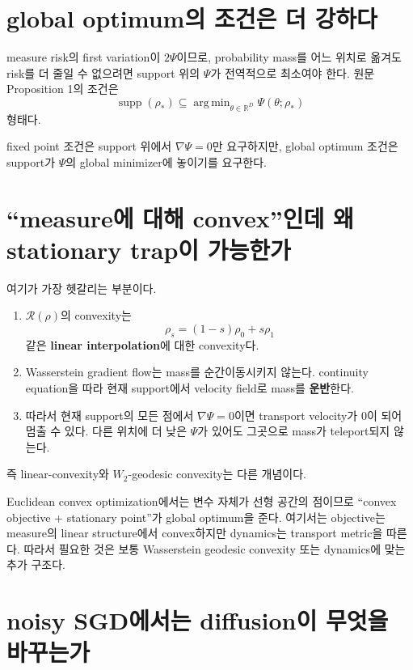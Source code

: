 \documentclass[11pt,a4paper,oneside,openany]{memoir}
\newcommand{\R}{\mathbb{R}}
\newcommand{\Risk}{\mathcal{R}}
\newcommand{\grad}{\nabla}
\newcommand{\supp}{\operatorname{supp}}
\DeclareMathOperator*{\argmin}{arg\,min}
\theoremstyle{definition}
\begin{document}
\section{global optimum의 조건은 더 강하다}

measure risk의 first variation이 $2\Psi$이므로, probability mass를 어느 위치로 옮겨도 risk를 더 줄일 수
없으려면 support 위의 $\Psi$가 전역적으로 최소여야 한다. 원문 Proposition 1의 조건은
\[
  \supp(\rho_*)
  \subseteq\argmin_{\theta\in\R^D}\Psi(\theta;\rho_*)
\]
형태다.

fixed point 조건은 support 위에서 $\grad\Psi=0$만 요구하지만,
global optimum 조건은 support가 $\Psi$의 global minimizer에 놓이기를 요구한다.

\section{``measure에 대해 convex''인데 왜 stationary trap이 가능한가}

여기가 가장 헷갈리는 부분이다.

\begin{enumerate}
  \item $\Risk(\rho)$의 convexity는
  \[
    \rho_s=(1-s)\rho_0+s\rho_1
  \]
  같은 \textbf{linear interpolation}에 대한 convexity다.

  \item Wasserstein gradient flow는 mass를 순간이동시키지 않는다. continuity equation을 따라
  현재 support에서 velocity field로 mass를 \textbf{운반}한다.

  \item 따라서 현재 support의 모든 점에서 $\grad\Psi=0$이면 transport velocity가 0이 되어 멈출 수 있다.
  다른 위치에 더 낮은 $\Psi$가 있어도 그곳으로 mass가 teleport되지 않는다.
\end{enumerate}

즉 linear-convexity와 $W_2$-geodesic convexity는 다른 개념이다.

\begin{suppbox}
Euclidean convex optimization에서는 변수 자체가 선형 공간의 점이므로
``convex objective + stationary point''가 global optimum을 준다.
여기서는 objective는 measure의 linear structure에서 convex하지만 dynamics는 transport metric을 따른다.
따라서 필요한 것은 보통 Wasserstein geodesic convexity 또는 dynamics에 맞는 추가 구조다.
\end{suppbox}

\section{noisy SGD에서는 diffusion이 무엇을 바꾸는가}
\end{document}
